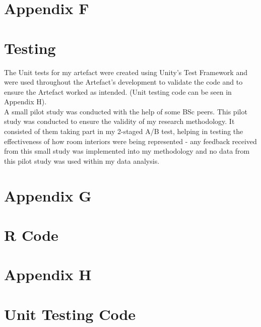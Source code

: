 \newpage
\section*{Appendix F}
\section*{Testing}
\label{append:f}
The Unit tests for my artefact were created using Unity's Test Framework and were used throughout the Artefact's development to validate the code and to ensure the Artefact worked as intended. (Unit testing code can be seen in Appendix H).
\\
A small pilot study was conducted with the help of some BSc peers. This pilot study was conducted to ensure the validity of my research methodology. It consisted of them taking part in my 2-staged A/B test, helping in testing the effectiveness of how room interiors were being represented - any feedback received from this small study was implemented into my methodology and no data from this pilot study was used within my data analysis.

\newpage
\section*{Appendix G}
\section*{R Code}
\label{append:g}

\newpage
\section*{Appendix H}
\section*{Unit Testing Code}
\label{append:h}
